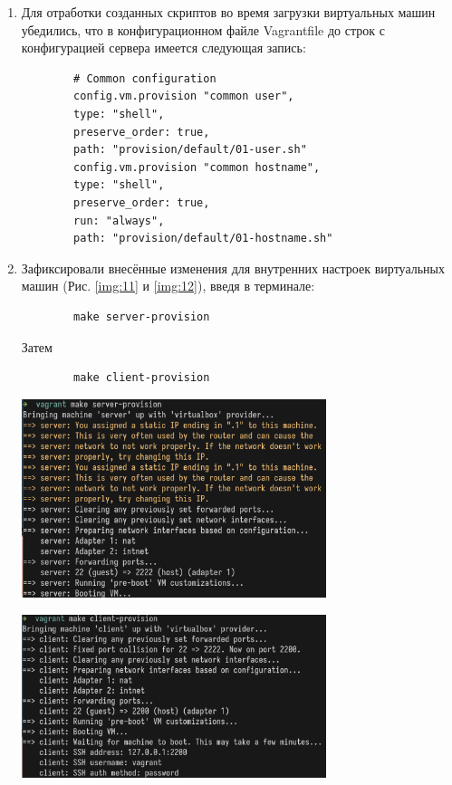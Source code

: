 \begin{enumerate}
    \item Для отработки созданных скриптов во время загрузки виртуальных машин убедились, что в конфигурационном файле Vagrantfile до строк с конфигурацией сервера имеется следующая запись:
        \begin{verbatim}
        # Common configuration
        config.vm.provision "common user",
        type: "shell",
        preserve_order: true,
        path: "provision/default/01-user.sh"
        config.vm.provision "common hostname",
        type: "shell",
        preserve_order: true,
        run: "always",
        path: "provision/default/01-hostname.sh"
        \end{verbatim}
    \item Зафиксировали внесённые изменения для внутренних настроек виртуальных машин (Рис. \ref{img:11} и \ref{img:12}), введя в терминале:
        \begin{verbatim}
        make server-provision
        \end{verbatim}
    Затем
        \begin{verbatim}
        make client-provision
        \end{verbatim}
            \begin{center}
        \centering
        \includegraphics[width=0.7\textwidth]{../images/img11.png}
        \label{img:11}
    \end{center}
    \begin{center}
        \centering
        \includegraphics[width=0.7\textwidth]{../images/img12.png}
        \label{img:12}
    \end{center}


\end{enumerate}
